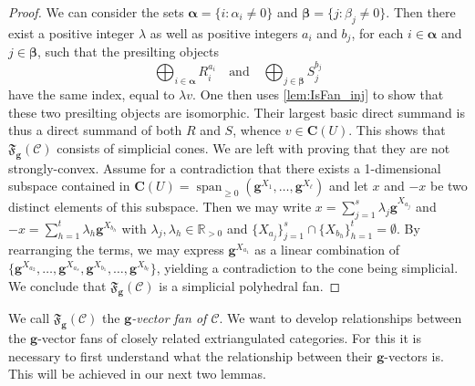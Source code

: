 \documentclass[10pt,twoside, a4paper,reqno]{amsart}
\DeclareMathOperator{\spann}{span}
\newcommand{\partfan}[1]{\mathfrak{F}_{\bfg}(#1)}
\newcommand{\R}{\mathbb{R}}
\newcommand{\calC}{\mathcal{C}}
\newcommand{\boldC}{\mathbf{C}}
\newcommand{\bfg}{\mathbf{g}}
\theoremstyle{definition}
\begin{document}
\begin{proof}
       We can consider the sets $\boldsymbol{\alpha} = \{i: \alpha_i \neq 0\}$ and $\boldsymbol{\beta} = \{ j: \beta_j \neq 0\}$. Then there exist a positive integer $\lambda$ as well as positive integers $a_i$ and $b_j$, for each $i \in \boldsymbol{\alpha}$ and $j \in \boldsymbol{\beta}$, such that the presilting objects
    \[ \bigoplus_{i \in \boldsymbol{\alpha}} {R_i^{a_i}} \quad \text{and} \quad \bigoplus_{j \in \boldsymbol{\beta}} S_j^{b_j}\]
 have the same index, equal to $\lambda v$. One then uses \eqref{lem:IsFan_inj} to show that {these two presilting objects} are isomorphic. Their largest basic direct summand is thus a direct summand of both $R$ and $S$, whence $v \in \boldC(U)$. This shows that $\partfan{\calC}$ consists of simplicial cones. We are left with proving that they are not strongly-convex. Assume for a contradiction that there exists a 1-dimensional subspace contained in $\boldC(U) = \spann_{\geq 0}(\bfg^{X_1}, \dots, \bfg^{X_\ell})$  and let $x$ and $-x$
 be two distinct elements of this subspace. Then we may write $x = \sum_{j=1}^s \lambda_j \bfg^{X_{a_j}}$ and $-x = \sum_{h = 1}^{t} \lambda_h \bfg^{X_{b_h}}$ with $\lambda_j, \lambda_h \in \R_{> 0}$ and $\{X_{a_j}\}_{j=1}^s \cap \{X_{b_h}\}_{h=1}^t = \emptyset$. By rearranging the terms, we may express $\bfg^{X_{a_1}}$ as a linear combination of $\{ \bfg^{X_{a_2}}, \dots, \bfg^{X_{a_s}}, \bfg^{X_{b_1}}, \dots, \bfg^{X_{b_t}}\}$, yielding a contradiction to the cone being simplicial. We conclude that $\partfan{\calC}$ is a simplicial polyhedral fan.     
\end{proof}

We call $\partfan{\calC}$ the \textit{$\bfg$-vector fan of $\calC$}. 
We want to develop relationships between the $\bfg$-vector fans of closely related extriangulated categories. For this it is necessary to first understand what the relationship between their $\bfg$-vectors is. This will be achieved in our next two lemmas. 
\end{document}
